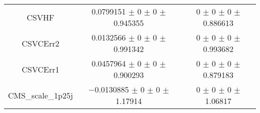 \begin{table}
\begin{tabular}{ccc}
CSVHF & \num{0.0799151} $\pm$ \num{0} $\pm$ \num{0} $\pm$ \num{0.945355} & \num{0} $\pm$ \num{0} $\pm$ \num{0} $\pm$ \num{0.886613}\\
CSVCErr2 & \num{0.0132566} $\pm$ \num{0} $\pm$ \num{0} $\pm$ \num{0.991342} & \num{0} $\pm$ \num{0} $\pm$ \num{0} $\pm$ \num{0.993682}\\
CSVCErr1 & \num{0.0457964} $\pm$ \num{0} $\pm$ \num{0} $\pm$ \num{0.900293} & \num{0} $\pm$ \num{0} $\pm$ \num{0} $\pm$ \num{0.879183}\\
CMS\_scale\_1p25j & \num{-0.0130885} $\pm$ \num{0} $\pm$ \num{0} $\pm$ \num{1.17914} & \num{0} $\pm$ \num{0} $\pm$ \num{0} $\pm$ \num{1.06817}\\
\bottomrule
\end{tabular}
\end{table}